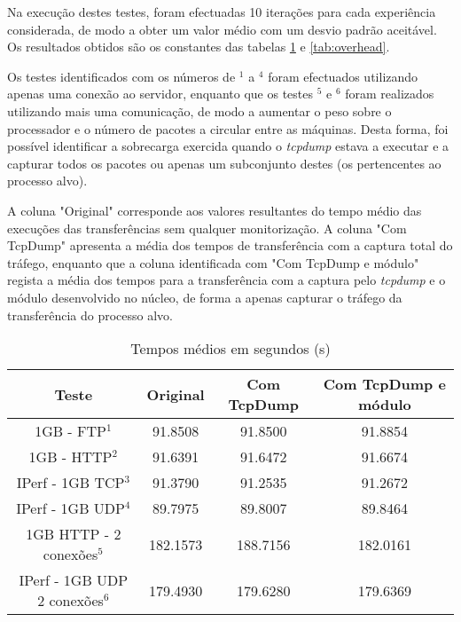 Na execução destes testes, foram efectuadas 10 iterações para cada experiência considerada, de modo a obter um valor médio com um desvio padrão aceitável.
Os resultados obtidos são os constantes das tabelas \ref{tab:desempenho} e \ref{tab:overhead}.

Os testes identificados com os números de $^{1}$ a $^{4}$ foram efectuados utilizando apenas uma conexão ao servidor, enquanto que os testes $^{5}$ e $^{6}$ foram realizados utilizando mais uma comunicação, de modo a aumentar o peso sobre o processador e o número de pacotes a circular entre as máquinas. 
Desta forma, foi possível identificar a sobrecarga exercida quando o \textit{tcpdump} estava a executar e a capturar todos os pacotes ou apenas um subconjunto destes (os pertencentes ao processo alvo).

A coluna "Original" corresponde aos valores resultantes do tempo médio das execuções das transferências sem qualquer monitorização.
A coluna "Com TcpDump" apresenta a média dos tempos de transferência com a captura total do tráfego, enquanto que a coluna identificada com "Com TcpDump e módulo" regista a média dos tempos para a transferência com a captura pelo \textit{tcpdump} e o módulo desenvolvido no núcleo, de forma a apenas capturar o tráfego da transferência do processo alvo.
\begin{table}
\begin{center}
\caption{Tempos médios em segundos (s)}
\begin{tabular}{ | c | c | c | c |  }
\hline
Teste & \hspace {0.3cm} Original \hspace {0.3cm}& \hspace {0.2cm} Com TcpDump \hspace {0.2cm} & Com TcpDump e módulo \\
\hline
1GB - FTP$^{1}$ & 91.8508	& 91.8500 & 91.8854 \\
1GB - HTTP$^{2}$ & 91.6391 & 91.6472 & 91.6674 \\ 
IPerf - 1GB TCP$^{3}$ & 91.3790	& 91.2535	& 91.2672 \\
IPerf - 1GB UDP$^{4}$ & 89.7975 & 89.8007 & 89.8464 \\
\hline
\hline
1GB HTTP - 2 conexões$^{5}$ & 182.1573 & 188.7156 & 182.0161 \\
IPerf - 1GB UDP 2 conexões$^{6}$ & 179.4930 & 179.6280 & 179.6369 \\
\hline
\end{tabular}
\label{tab:desempenho}
\end{center}
\end{table}

